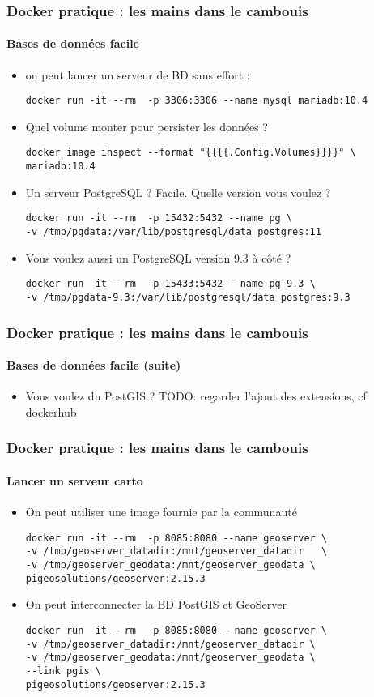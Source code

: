 \documentclass[11pt]{beamer}
\begin{document}
\begin{frame}[fragile]
\frametitle{Docker pratique : les mains dans le cambouis }
\framesubtitle{Bases de données facile}
\begin{itemize}
	\item on peut lancer un serveur de BD sans effort : 
	\begin{lstlisting}
docker run -it --rm  -p 3306:3306 --name mysql mariadb:10.4
	\end{lstlisting}
	\item Quel volume monter pour persister les données ?
	\begin{lstlisting}
docker image inspect --format "{{{{.Config.Volumes}}}}" \
mariadb:10.4
	\end{lstlisting}
	\item Un serveur PostgreSQL ? Facile. Quelle version vous voulez ?
	\begin{lstlisting}
docker run -it --rm  -p 15432:5432 --name pg \ 
-v /tmp/pgdata:/var/lib/postgresql/data postgres:11
	\end{lstlisting}
	\item Vous voulez aussi un PostgreSQL version 9.3 à côté ?
	\begin{lstlisting}
docker run -it --rm  -p 15433:5432 --name pg-9.3 \
-v /tmp/pgdata-9.3:/var/lib/postgresql/data postgres:9.3
	\end{lstlisting}
\end{itemize}
\end{frame}

\begin{frame}[fragile]
\frametitle{Docker pratique : les mains dans le cambouis }
\framesubtitle{Bases de données facile (suite)}
\begin{itemize}
	\item Vous voulez du PostGIS ?
	TODO: regarder l'ajout des extensions, cf dockerhub
\end{itemize}
\end{frame}

\begin{frame}[fragile]
\frametitle{Docker pratique : les mains dans le cambouis }
\framesubtitle{Lancer un serveur carto}
\begin{itemize}
	\item On peut utiliser une image fournie par la communauté
	\begin{lstlisting}
docker run -it --rm  -p 8085:8080 --name geoserver \
-v /tmp/geoserver_datadir:/mnt/geoserver_datadir   \
-v /tmp/geoserver_geodata:/mnt/geoserver_geodata \
pigeosolutions/geoserver:2.15.3
	\end{lstlisting}
	\item On peut interconnecter la BD PostGIS  et GeoServer
	\begin{lstlisting}
docker run -it --rm  -p 8085:8080 --name geoserver \
-v /tmp/geoserver_datadir:/mnt/geoserver_datadir \
-v /tmp/geoserver_geodata:/mnt/geoserver_geodata \
--link pgis \
pigeosolutions/geoserver:2.15.3
	\end{lstlisting}
\end{itemize}
\end{frame}
\end{document}
